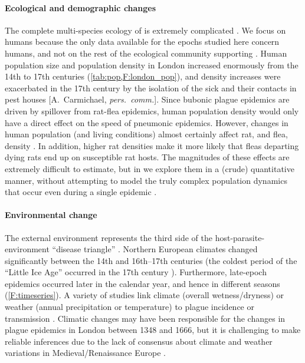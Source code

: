 \paragraph{Ecological and demographic changes}

The complete multi-species ecology of \ypestis is extremely complicated \cite{DubyYesz16}.  We focus on humans because the only data available for the epochs studied here concern humans, and not on the rest of the ecological community supporting \ypestis.  Human population size and population density in London increased enormously from the 14th to 17th centuries \cite{Finl81,FinlShea86,Kryl11} (\cref{tab:pop,F:london_pop}), and density increases were exacerbated in the 17th century by the isolation of the sick and their contacts in pest houses [A.~Carmichael, \emph{pers.\ comm.}].  Since bubonic plague epidemics are driven by spillover from rat-flea epidemics, human population density would only have a direct effect on the speed of pneumonic epidemics.  However, changes in human population (and living conditions) almost certainly affect rat, and flea, density \cite{McCo03}.  In addition, higher rat densities make it more likely that fleas departing dying rats end up on susceptible rat hosts.  The magnitudes of these effects are extremely difficult to estimate, but in \supp we explore them in a (crude) quantitative manner, without attempting to model the truly complex population dynamics that occur even during a single epidemic \cite{KeelGill00b,LaPerriere+2009}.

\paragraph{Environmental change}

The external environment represents the third side of the host-parasite-environment ``disease triangle'' \cite{Scho07}.  Northern European climates changed significantly between the 14th and 16th--17th centuries (the coldest period of the ``Little Ice Age'' occurred in the 17th century \cite{Matt39} \cite[Figure 1]{Jone+13}).  Furthermore, late-epoch epidemics occurred later in the calendar year, and hence in different seasons (\cref{F:timeseries}).  A variety of studies link climate (\eg overall wetness/dryness) or weather (\eg annual precipitation or temperature) to plague incidence or transmission \cite{Cava71,Xu+11,Xu+14,Pham+09,YueLee18,BenA+10,Scho+11}.  Climatic changes may have been responsible for the changes in plague epidemics in London between 1348 and 1666, but it is challenging to make reliable inferences due to the lack of consensus about climate and weather variations in Medieval/Renaissance Europe \cite{Nesj+08}.

